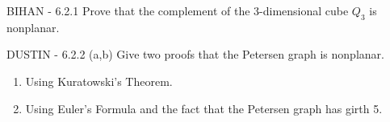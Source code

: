 \documentclass[12pt]{article}
\newenvironment{question}[2][Question]{\begin{trivlist}
\item[\hskip \labelsep {\bfseries #1}\hskip \labelsep {\bfseries #2.}]}{\end{trivlist}}
\begin{document}
\begin{question}{4} - \color{blue}BIHAN\color{black} - 
6.2.1  Prove that the complement of the 3-dimensional cube $Q_3$ is nonplanar.
\end{question}

\begin{question}{5}  - \color{blue}DUSTIN\color{black} - 
6.2.2 (a,b) Give two proofs that the Petersen graph is nonplanar.
\begin{enumerate}[label=\alph*)]
  \item Using Kuratowski's Theorem.
  \item Using Euler's Formula and the fact that the Petersen graph has girth 5.
\end{enumerate}

\end{question}




\end{document}
